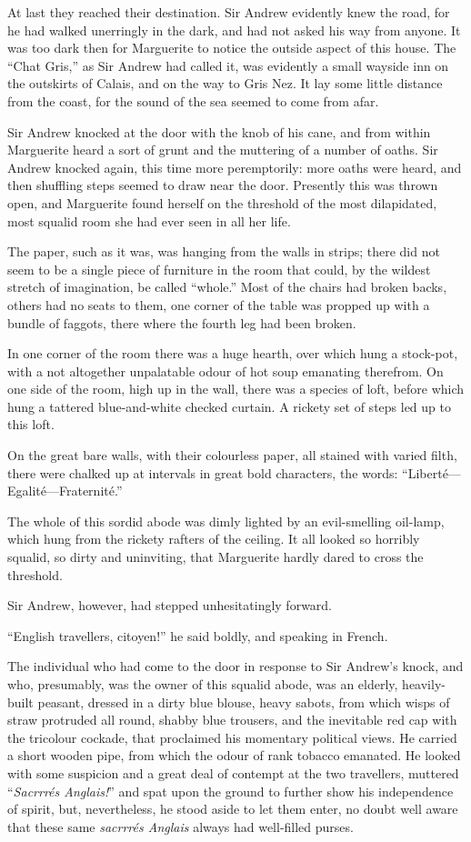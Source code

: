 At last they reached their destination. Sir Andrew evidently knew the road, for he had walked unerringly in the dark, and had not asked his way from anyone. It was too dark then for Marguerite to notice the outside aspect of this house. The \enquote{Chat Gris,} as Sir Andrew had called it, was evidently a small wayside inn on the outskirts of Calais, and on the way to Gris Nez. It lay some little distance from the coast, for the sound of the sea seemed to come from afar.

Sir Andrew knocked at the door with the knob of his cane, and from within Marguerite heard a sort of grunt and the muttering of a number of oaths. Sir Andrew knocked again, this time more peremptorily: more oaths were heard, and then shuffling steps seemed to draw near the door. Presently this was thrown open, and Marguerite found herself on the threshold of the most dilapidated, most squalid room she had ever seen in all her life.

The paper, such as it was, was hanging from the walls in strips; there did not seem to be a single piece of furniture in the room that could, by the wildest stretch of imagination, be called \enquote{whole.} Most of the chairs had broken backs, others had no seats to them, one corner of the table was propped up with a bundle of faggots, there where the fourth leg had been broken.

In one corner of the room there was a huge hearth, over which hung a stock-pot, with a not altogether unpalatable odour of hot soup emanating therefrom. On one side of the room, high up in the wall, there was a species of loft, before which hung a tattered blue-and-white checked curtain. A rickety set of steps led up to this loft.

On the great bare walls, with their colourless paper, all stained with varied filth, there were chalked up at intervals in great bold characters, the words: \enquote{Liberté---Egalité---Fraternité.}

The whole of this sordid abode was dimly lighted by an evil-smelling oil-lamp, which hung from the rickety rafters of the ceiling. It all looked so horribly squalid, so dirty and uninviting, that Marguerite hardly dared to cross the threshold.

Sir Andrew, however, had stepped unhesitatingly forward.

\enquote{English travellers, citoyen!} he said boldly, and speaking in French.

The individual who had come to the door in response to Sir Andrew's knock, and who, presumably, was the owner of this squalid abode, was an elderly, heavily-built peasant, dressed in a dirty blue blouse, heavy sabots, from which wisps of straw protruded all round, shabby blue trousers, and the inevitable red cap with the tricolour cockade, that proclaimed his momentary political views. He carried a short wooden pipe, from which the odour of rank tobacco emanated. He looked with some suspicion and a great deal of contempt at the two travellers, muttered \enquote{\textit{Sacrrrés Anglais!}} and spat upon the ground to further show his independence of spirit, but, nevertheless, he stood aside to let them enter, no doubt well aware that these same \textit{sacrrrés Anglais} always had well-filled purses.

